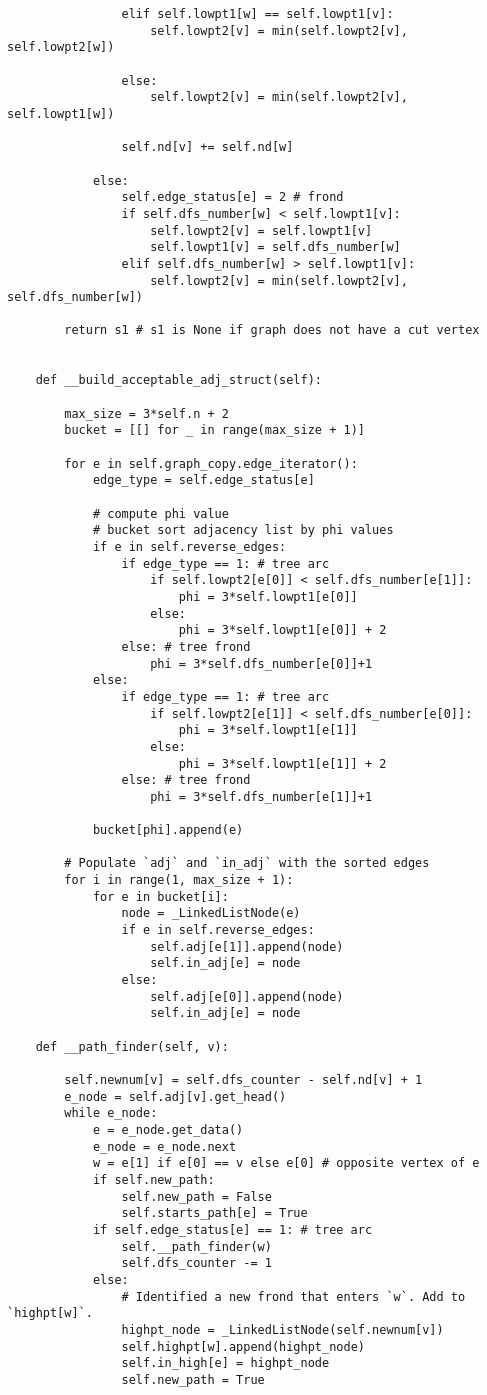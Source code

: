 \begin{verbatim}
				elif self.lowpt1[w] == self.lowpt1[v]:
					self.lowpt2[v] = min(self.lowpt2[v], self.lowpt2[w])

				else:
					self.lowpt2[v] = min(self.lowpt2[v], self.lowpt1[w])

				self.nd[v] += self.nd[w]

			else:
				self.edge_status[e] = 2 # frond
				if self.dfs_number[w] < self.lowpt1[v]:
					self.lowpt2[v] = self.lowpt1[v]
					self.lowpt1[v] = self.dfs_number[w]
				elif self.dfs_number[w] > self.lowpt1[v]:
					self.lowpt2[v] = min(self.lowpt2[v], self.dfs_number[w])

		return s1 # s1 is None if graph does not have a cut vertex


	def __build_acceptable_adj_struct(self):

		max_size = 3*self.n + 2
		bucket = [[] for _ in range(max_size + 1)]

		for e in self.graph_copy.edge_iterator():
			edge_type = self.edge_status[e]

			# compute phi value
			# bucket sort adjacency list by phi values
			if e in self.reverse_edges:
				if edge_type == 1: # tree arc
					if self.lowpt2[e[0]] < self.dfs_number[e[1]]:
						phi = 3*self.lowpt1[e[0]]
					else:
						phi = 3*self.lowpt1[e[0]] + 2
				else: # tree frond
					phi = 3*self.dfs_number[e[0]]+1
			else:
				if edge_type == 1: # tree arc
					if self.lowpt2[e[1]] < self.dfs_number[e[0]]:
						phi = 3*self.lowpt1[e[1]]
					else:
						phi = 3*self.lowpt1[e[1]] + 2
				else: # tree frond
					phi = 3*self.dfs_number[e[1]]+1

			bucket[phi].append(e)

		# Populate `adj` and `in_adj` with the sorted edges
		for i in range(1, max_size + 1):
			for e in bucket[i]:
				node = _LinkedListNode(e)
				if e in self.reverse_edges:
					self.adj[e[1]].append(node)
					self.in_adj[e] = node
				else:
					self.adj[e[0]].append(node)
					self.in_adj[e] = node

	def __path_finder(self, v):

		self.newnum[v] = self.dfs_counter - self.nd[v] + 1
		e_node = self.adj[v].get_head()
		while e_node:
			e = e_node.get_data()
			e_node = e_node.next
			w = e[1] if e[0] == v else e[0] # opposite vertex of e
			if self.new_path:
				self.new_path = False
				self.starts_path[e] = True
			if self.edge_status[e] == 1: # tree arc
				self.__path_finder(w)
				self.dfs_counter -= 1
			else:
				# Identified a new frond that enters `w`. Add to `highpt[w]`.
				highpt_node = _LinkedListNode(self.newnum[v])
				self.highpt[w].append(highpt_node)
				self.in_high[e] = highpt_node
				self.new_path = True



\end{verbatim}
